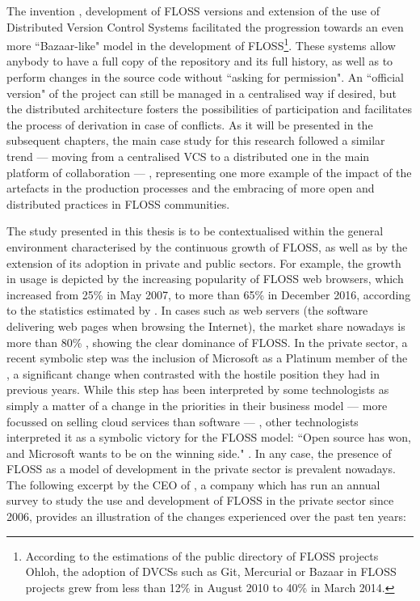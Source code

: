 The invention \parencite{milewski1997distributed}, development of FLOSS versions and extension of the use of Distributed Version Control Systems facilitated the progression towards an even more ``Bazaar-like" model in the development of FLOSS\footnote{According to the estimations of the public directory of FLOSS projects Ohloh, the adoption of DVCSs such as Git, Mercurial or Bazaar in FLOSS projects grew from less than 12\% \parencite{ohloh-repos:2010:Online} in August 2010 to 40\% \parencite{ohloh-repos:2014:Online} in March 2014.}. These systems allow anybody to have a full copy of the repository and its full history, as well as to perform changes in the source code without ``asking for permission". An ``official version" of the project can still be managed in a centralised way if desired, but the distributed architecture fosters the possibilities of participation and facilitates the process of derivation in case of conflicts. As it will be presented in the subsequent chapters, the main case study for this research followed a similar trend --- moving from a centralised VCS to a distributed one in the main platform of collaboration \parencite{drupal-migration-git:Online} --- , representing one more example of the impact of the artefacts in the production processes and the embracing of more open and distributed practices in FLOSS communities.

The study presented in this thesis is to be contextualised within the general environment characterised by the continuous growth of FLOSS, as well as by the extension of its adoption in private and public sectors. For example, the growth in usage is depicted by the increasing popularity of FLOSS web browsers, which increased from 25\% \parencite{browser-stats-may2007:2014:Online} in May 2007, to more than 65\% in December 2016, according to the statistics estimated by \textcite{browser-stats-dec2016:Online}. In cases such as web servers (the software delivering web pages when browsing the Internet), the market share nowadays is more than 80\% \parencite{webserver-stats:Online}, showing the clear dominance of FLOSS. In the private sector, a recent symbolic step was the inclusion of Microsoft as a Platinum member of the \textcite{ms-linux:Online}, a significant change when contrasted with the hostile position they had in previous years. While this step has been interpreted by some technologists as simply a matter of a change in the priorities in their business model \parencite{ms-linux-forbes:Online} --- more focussed on selling cloud services than software --- , other technologists interpreted it as a symbolic victory for the FLOSS model: ``Open source has won, and Microsoft wants to be on the winning side." \parencite{ms-linux-cw:Online}. In any case, the presence of FLOSS as a model of development in the private sector is prevalent nowadays. The following excerpt by the CEO of \textcite{black-duck-oss:Online}, a company which has run an annual survey to study the use and development of FLOSS in the private sector since 2006, provides an illustration of the changes experienced over the past ten years:

